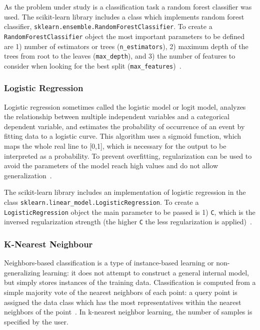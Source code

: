 \documentclass[letterpaper,10pt]{article}
\theoremstyle{mytheor}
\begin{document}
As the problem under study is a classification task a random forest classifier was used. The scikit-learn library includes a class which implements random forest classifier, \lstinline|sklearn.ensemble.RandomForestClassifier|. To create a \lstinline|RandomForestClassifier| object the most important parameters to be defined are 1)  number of estimators or trees (\lstinline|n_estimators|), 2) maximum depth of the trees from root to the leaves (\lstinline|max_depth|), and  3) the number of features to consider when looking for the best split (\lstinline|max_features|)~\cite{scikit-learn}. 

\subsubsection{Logistic Regression}
Logistic regression sometimes called the logistic model or logit model, analyzes the relationship between multiple independent variables and a categorical dependent variable, and estimates the probability of occurrence of an event by fitting data to a logistic curve. This algorithm uses a sigmoid function, which maps the whole real line to [0,1], which is necessary for the output to be interpreted as a probability. To prevent overfitting, regularization can be used to avoid the parameters of the model reach high values and do not allow generalization~\cite{park2013introduction}.

The scikit-learn library includes an implementation of logistic regression in the class \lstinline|sklearn.linear_model.LogisticRegression|. To create a \lstinline|LogisticRegression| object the main parameter to be passed is 1) \lstinline|C|, which is the inversed regularization strength (the higher \lstinline|C| the less regularization is applied)~\cite{scikit-learn}. 

\subsubsection{K-Nearest Neighbour}
Neighbors-based classification is a type of instance-based learning or non-generalizing learning: it does not attempt to construct a general internal model, but simply stores instances of the training data. Classification is computed from a simple majority vote of the nearest neighbors of each point: a query point is assigned the data class which has the most representatives within the nearest neighbors of the point~\cite{knnsklearn}. In k-nearest neighbor learning, the number of samples is specified by the user.
\end{document}
